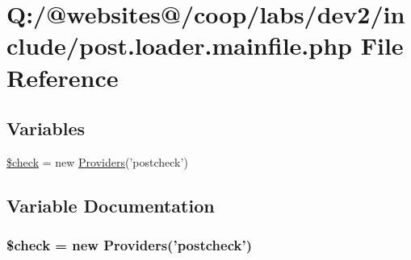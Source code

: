 \hypertarget{post_8loader_8mainfile_8php}{\section{Q\-:/@websites@/coop/labs/dev2/include/post.loader.\-mainfile.\-php File Reference}
\label{post_8loader_8mainfile_8php}
}
\subsection*{Variables}
\begin{DoxyCompactItemize}
\item 
\hyperlink{post_8loader_8mainfile_8php_a830cf70d25fefacddcf4c6bc3fd7a0e0}{\$check} = new \hyperlink{class_providers}{Providers}('postcheck')
\end{DoxyCompactItemize}


\subsection{Variable Documentation}
\hypertarget{post_8loader_8mainfile_8php_a830cf70d25fefacddcf4c6bc3fd7a0e0}{
\subsubsection[{\$check}]{\setlength{\rightskip}{0pt plus 5cm}\$check = new {\bf Providers}('postcheck')}}\label{post_8loader_8mainfile_8php_a830cf70d25fefacddcf4c6bc3fd7a0e0}
